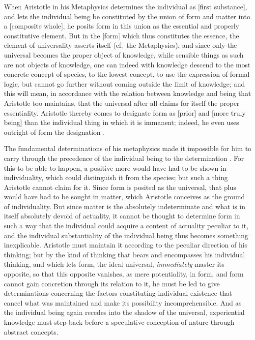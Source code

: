 When Aristotle in his Metaphysics determines the individual as 
[first substance], and lets the individual being be constituted by the
union of form and matter into a  [composite whole], he posits form
in this union as the essential and properly constitutive element. But
in the  [form] which thus constitutes the essence, the
element of universality asserts itself (cf.\ the Metaphysics), and
since only the universal becomes the proper object of knowledge, while
sensible things as such are not objects of knowledge, one can indeed
with knowledge descend to the most concrete concept of species, to the
lowest concept, to use the expression of formal logic, but cannot go
further without coming outside the limit of knowledge; and this will
mean, in accordance with the relation between knowledge and being that
Aristotle too maintains, that the universal after all claims for itself
the proper essentiality. Aristotle thereby comes to designate form as
 [prior] and  [more truly being] than the individual thing in
which it is immanent; indeed, he even uses outright of form the
designation .

The fundamental determinations of his metaphysics made it impossible
for him to carry through the precedence of the individual being to the
determination . For this to be able to happen, a positive more
would have had to be shown in individuality, which could distinguish it
from the species; but such a thing Aristotle cannot claim for it. Since
form is posited as the universal, that plus would have had to be sought
in matter, which Aristotle conceives as the ground of individuality.
But since matter is the absolutely indeterminate and what is in itself
absolutely devoid of actuality, it cannot be thought to determine form
in such a way that the individual could acquire a content of actuality
peculiar to it, and the individual substantiality of the individual
being thus becomes something inexplicable. Aristotle must maintain it
according to the peculiar direction of his thinking; but by the kind of
thinking that bears and encompasses his individual thinking, and which
lets form, the ideal universal, \emph{immediately} master its opposite,
so that this opposite vanishes, as mere potentiality, in form, and form
cannot gain concretion through its relation to it, he must be led to
give determinations concerning the factors constituting individual
existence that cancel what was maintained and make its possibility
incomprehensible. And as the individual being again recedes into the
shadow of the universal, experiential knowledge must step
back before a speculative conception of nature through abstract
concepts.

